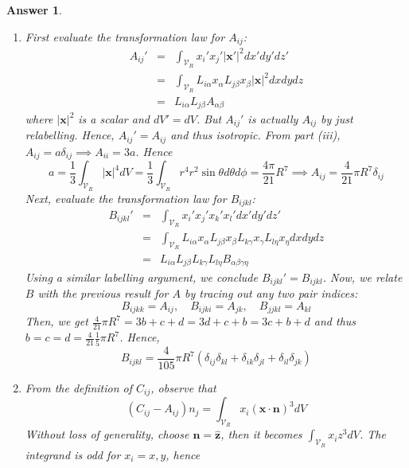 \documentclass[a4paper]{article}
\newtheorem{ans}{Answer}[section]
\theoremstyle{new}
\begin{document}
\begin{ans}
\begin{enumerate}[label=(\roman*)]
    $$T_{12}=R_{1p}R_{2q}T_{pq}=R_{11}R_{23}T_{13}=-T_{13}=0$$
    $$T_{31}=R_{3p}R_{1q}T_{pq}=R_{32}R_{11}T_{21}=-T_{21}$$
    $$T_{21}=R_{2p}R_{1q}T_{pq}=R_{23}R_{11}T_{31}=T_{31}$$
    so $T_{31}=T_{21}=0$. We also have
    $$T_{22}=R_{2p}R_{2q}T_{pq}=R_{23}R_{23}T_{33}=T_{33}$$
    Combining the result from the two rotations, we conclude that all the off-diagonal elements of $T$ are zero, i.e. $T_{ij}=0$ if $i\neq j$ and all diagonal elements are equal, i.e. $T_{11}=T_{22}=T_{33}$. Hence $T_{ij}=\alpha\delta_{ij}$ for scalar $\alpha$.
\item First evaluate the transformation law for $A_{ij}$:
\begin{eqnarray}
A_{ij}'&=&\int_{\mathcal{V}_R}x_i'x_j'|\mathbf{x'}|^2dx'dy'dz'\nonumber\\&=&\int_{\mathcal{V}_R}L_{i\alpha}x_\alpha L_{j\beta}x_\beta|\mathbf{x}|^2dxdydz\nonumber\\&=&L_{i\alpha}L_{j\beta}A_{\alpha\beta}\nonumber
\end{eqnarray}
where $|\mathbf{x}|^2$ is a scalar and $dV'=dV$. But $A_{ij}'$ is actually $A_{ij}$ by just relabelling. Hence, $A_{ij}'=A_{ij}$ and thus isotropic. From part (iii), $A_{ij}=a\delta_{ij}\implies A_{ii}=3a$. Hence
$$a=\frac{1}{3}\int_{\mathcal{V}_R}|\mathbf{x}|^4dV=\frac{1}{3}\int_{\mathcal{V}_R}r^4r^2\sin\theta d\theta d\phi=\frac{4\pi}{21}R^7\implies A_{ij}=\frac{4}{21}\pi R^7\delta_{ij}$$
Next, evaluate the transformation law for $B_{ijkl}$:
\begin{eqnarray}
B_{ijkl}'&=&\int_{\mathcal{V}_R}x_i'x_j'x_k'x_l'dx'dy'dz'\nonumber\\&=&\int_{\mathcal{V}_R}L_{i\alpha}x_\alpha L_{j\beta}x_\beta L_{k\gamma}x_\gamma L_{l\eta}x_\eta dxdydz\nonumber\\&=&L_{i\alpha}L_{j\beta}L_{k\gamma}L_{l\eta}B_{\alpha\beta\gamma\eta}\nonumber
\end{eqnarray}
Using a similar labelling argument, we conclude $B_{ijkl}'=B_{ijkl}$. Now, we relate $B$ with the previous result for $A$ by tracing out any two pair indices: $$B_{ijkk}=A_{ij},\quad B_{ijki}=A_{jk},\quad B_{jjkl}=A_{kl}$$
Then, we get $\frac{4}{21}\pi R^7=3b+c+d=3d+c+b=3c+b+d$ and thus $b=c=d=\frac{4}{21}\frac{1}{5}\pi R^7$. Hence,
$$B_{ijkl}=\frac{4}{105}\pi R^7(\delta_{ij}\delta_{kl}+\delta_{ik}\delta_{jl}+\delta_{il}\delta_{jk})$$
\item From the definition of $C_{ij}$, observe that
$$(C_{ij}-A_{ij})n_j=\int_{\mathcal{V}_R}x_i(\mathbf{x}\cdot\mathbf{n})^3dV$$
Without loss of generality, choose $\mathbf{n}=\mathbf{\hat{z}}$, then it becomes $\int_{\mathcal{V}_R}x_iz^3dV$. The integrand is odd for $x_i=x,y$, hence

\end{enumerate}
\end{ans}
\end{document}
